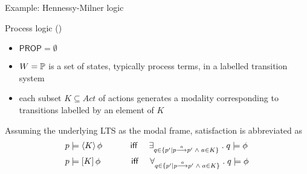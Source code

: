 \documentclass{beamer}
\begin{document}
\begin{slide}{Example: Hennessy-Milner logic}\label{s:17}
\small
\begin{block}{Process logic ()}
\begin{itemize}
\item $\mathsf{PROP} = \emptyset$
\item $W = \mathbb{P}$ is a set of states, typically process terms, in a labelled transition system 
\item each subset $K \subseteq Act$ of actions generates a modality corresponding to transitions labelled by an element of $K$ 
\end{itemize}
\end{block}
Assuming the underlying LTS  as the modal frame, satisfaction is abbreviated as
\begin{align*}
p & \models \langle K \rangle\, \phi \text{ ~~~~~~~~ \textsf{iff} ~~~}
\exists_{q \in \mathopen{\{} p' \mathbin{|} p \stackrel{a}{\longrightarrow} p' \; \mathbin{\wedge}\;  a \in K \mathclose{\}}}\; .\; q \models \phi \\
p & \models [K]\, \phi \text{~~~~~~~~~~ \textsf{iff} ~~~}
\forall_{q \in \mathopen{\{} p' \mathbin{|} p \stackrel{a}{\longrightarrow} p' \; \mathbin{\wedge}\;  a \in K \mathclose{\}}}\; .\; q \models \phi 
\end{align*}
\end{slide}
\end{document}
